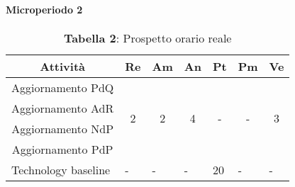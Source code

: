 \paragraph{Microperiodo 2}
\begin{table}[H]
	\centering
	\begin{tabular}{|c|c|c|c|c|c|c|}
		\hline
		\rowcolor{lighter-grayer}
		\textbf{Attività}                         & \textbf{Re}            & \textbf{Am}            & \textbf{An}            & \textbf{Pt}             & \textbf{Pm}            & \textbf{Ve}            \\ \hline
		Aggiornamento PdQ                         & \multirow{4}{*}{2}     & \multirow{4}{*}{2}     & \multirow{4}{*}{4}     & \multirow{4}{*}{-}      & \multirow{4}{*}{-}     & \multirow{4}{*}{3}     \\ \cline{1-1}
		Aggiornamento AdR                         &                        &                        &                        &                         &                        &                        \\ \cline{1-1}
		Aggiornamento NdP                         &                        &                        &                        &                         &                        &                        \\ \cline{1-1}
		Aggiornamento PdP                         &                        &                        &                        &                         &                        &                        \\ \hline
		\multicolumn{1}{|l|}{Technology baseline} & \multicolumn{1}{l|}{-} & \multicolumn{1}{l|}{-} & \multicolumn{1}{l|}{-} & \multicolumn{1}{l|}{20} & \multicolumn{1}{l|}{-} & \multicolumn{1}{l|}{-} \\ \hline
	\end{tabular}
\caption*{\textbf{Tabella 2}: Prospetto orario reale\\}
\end{table}

